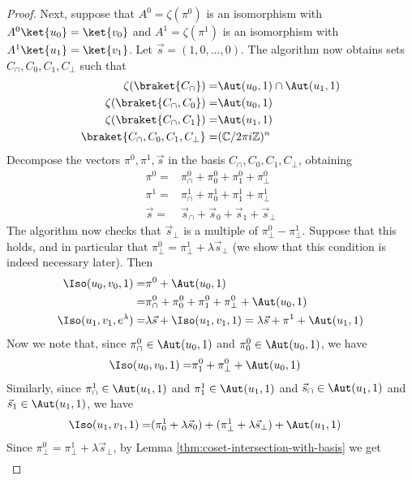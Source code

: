 \begin{proof}
	Next, suppose that $A^0=\zeta(\pi^0)$ is an isomorphism with $A^0\ket{u_0}=\ket{v_0}$ and $A^1=\zeta(\pi^1)$ is an isomorphism with $A^1\ket{u_1}=\ket{v_1}$.
	Let $\vec s=(1,0,\ldots, 0)$.
	The algorithm now obtains sets $C_\cap, C_0,C_1,C_\bot$ such that
	\begin{align}
		\zeta(\braket{C_\cap}) = & \Aut(u_0,1)\cap \Aut(u_1,1) \\
		\zeta(\braket{C_\cap,C_0}) = & \Aut(u_0,1) \\
		\zeta(\braket{C_\cap,C_1}) = & \Aut(u_1,1) \\
		\braket{C_\cap,C_0,C_1,C_\bot} = & (\mathbb C/2\pi i\mathbb Z)^{n}
	\end{align}
	Decompose the vectors $\pi^0,\pi^1,\vec s$ in the basis $C_\cap,C_0,C_1,C_\bot$, obtaining
	\begin{align}
		\pi^0 = & \pi_\cap^0 + \pi_0^0 + \pi_1^0 + \pi_\bot^0 \\
		\pi^1 = & \pi_\cap^1 + \pi_0^1 + \pi_1^1 + \pi_\bot^1 \\
		\vec s = & \vec s_\cap + \vec s_0 + \vec s_1+\vec s_\bot
	\end{align}
	The algorithm now checks that $\vec s_\bot$ is a multiple of $\pi_\bot^0 - \pi_\bot^1$.
	Suppose that this holds, and in particular that $\pi_\bot^0=\pi_\bot^1 + \lambda\vec s_\bot$ (we show that this condition is indeed necessary later).
	Then
	\begin{align}
		\Iso(u_0,v_0,1) = & \pi^0 + \Aut(u_0,1) \\
		= & \pi_\cap^0 + \pi_0^0 + \pi_1^0 + \pi_\bot^0 + \Aut(u_0,1) \\
		\Iso(u_1,v_1,e^\lambda) = & \lambda \vec s + \Iso(u_1,v_1,1) = \lambda \vec s + \pi^1 + \Aut(u_1,1)
	\end{align}
	Now we note that, since $\pi_\cap^0\in \Aut(u_0,1)$ and $\pi_0^0\in \Aut(u_0,1)$, we have
	\begin{align}
		\Iso(u_0,v_0,1) = & \pi_1^0 + \pi_\bot^0 + \Aut(u_0,1)
	\end{align}
	Similarly, since $\pi_\cap^1\in \Aut(u_1,1)$ and $\pi_1^1\in \Aut(u_1,1)$ and $\vec s_\cap\in \Aut(u_1,1)$ and $\vec s_1\in \Aut(u_1,1)$, we have
	\begin{align}
		\Iso(u_1,v_1,1) = & (\pi_0^1 + \lambda\vec s_0) + (\pi_\bot^1 + \lambda \vec s_\bot) + \Aut(u_1,1)
	\end{align}
	Since $\pi_\bot^0=\pi_\bot^1 + \lambda\vec s_\bot$, by Lemma \ref{thm:coset-intersection-with-basis} we get
	\begin{align}

\end{align}
\end{proof}
